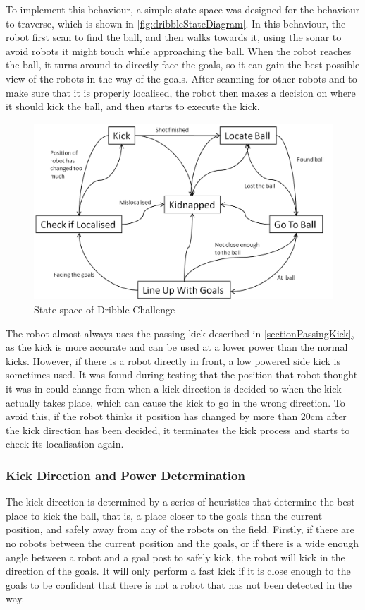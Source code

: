 \documentclass[pdftex,11pt,a4paper]{report}
\begin{document}
To implement this behaviour, a simple state space was designed for the behaviour to traverse, which is shown in \autoref{fig:dribbleStateDiagram}. In this behaviour, the robot first scan to find the ball, and then walks towards it, using the sonar to avoid robots it might touch while approaching the ball. When the robot reaches the ball, it turns around to directly face the goals, so it can gain the best possible view of the robots in the way of the goals. After scanning for other robots and to make sure that it is properly localised, the robot then makes a decision on where it should kick the ball, and then starts to execute the kick. 

\begin{figure} [t]
\centering
\includegraphics[width=1.0\textwidth]{figures/dribbleStateDiagram.png}
\caption{State space of Dribble Challenge} \label{fig:dribbleStateDiagram}
\end{figure}

The robot almost always uses the passing kick described in \autoref{sectionPassingKick}, as the kick is more accurate and can be used at a lower power than the normal kicks. However, if there is a robot directly in front, a low powered side kick is sometimes used. It was found during testing that the position that robot thought it was in could change from when a kick direction is decided to when the kick actually takes place, which can cause the kick to go in the wrong direction. To avoid this, if the robot thinks it position has changed by more than 20cm after the kick direction has been decided, it terminates the kick process and starts to check its localisation again.
\subsubsection{Kick Direction and Power Determination}
The kick direction is determined by a series of heuristics that determine the best place to kick the ball, that is, a place closer to the goals than the current position, and safely away from any of the robots on the field. Firstly, if there are no robots between the current position and the goals, or if there is a wide enough angle between a robot and a goal post to safely kick, the robot will kick in the direction of the goals. It will only perform a fast kick if it is close enough to the goals to be confident that there is not a robot that has not been detected in the way.
\end{document}

